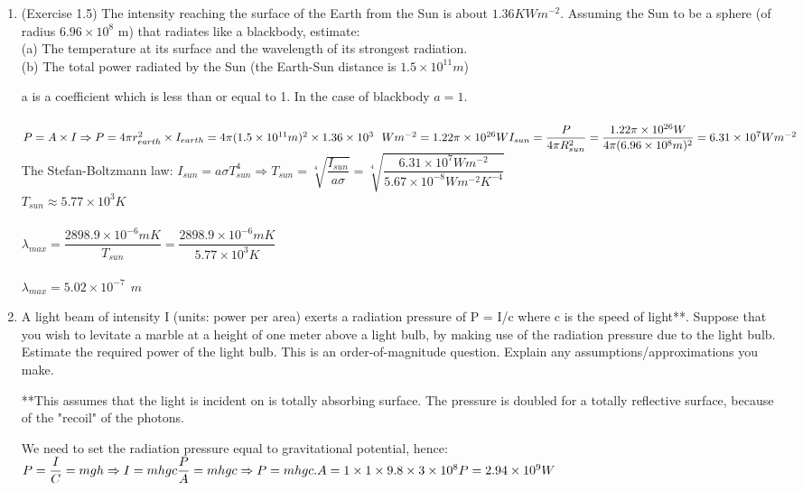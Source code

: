 \documentclass[fleqn]{article}
\begin{document}
\begin{enumerate}
    \item (Exercise 1.5) The intensity reaching the surface of the Earth from the Sun is about $1.36 K Wm^{-2}$. Assuming the Sun to be a sphere (of radius $6.96 \times 10^8$ m) that radiates like a blackbody, estimate: \\
    (a) The temperature at its surface and the wavelength of its strongest radiation. \\
    (b) The total power radiated by the Sun (the Earth-Sun distance is $1.5 \times 10^{11} m$)

      \textcolor{hwColor}{
        a is a coefficient which is less than or equal to 1. In the case of 
        blackbody $a=1$. \\
        \\
        $
          P=A \times I \Rightarrow P=4\pi r_{earth}^2 \times I_{earth}=4\pi(1.5 \times 10^{11} m)^2 \times 1.36 \times 10^3 ~~ Wm^{-2}=1.22 \pi \times 10^{26} W \\
          \\
          I_{sun}=\dfrac{P}{4 \pi R_{sun}^2}=\dfrac{1.22 \pi \times 10^{26} W}{4\pi (6.96 \times 10^8 m)^2}=6.31 \times 10^7 Wm^{-2} \\
        $
        The Stefan-Boltzmann law: $I_{sun}=a \sigma T_{sun}^4 \Longrightarrow T_{sun}=\sqrt[4]{\dfrac{I_{sun}}{a\sigma}}=\sqrt[4]{\dfrac{6.31 \times 10^7 Wm^{-2}}{5.67 \times 10^{-8} W m^{-2} K^{-4}}}$ \\
        $T_{sun} \approx 5.77 \times 10^3 K$ \\
        \\
        $\lambda_{max}=\dfrac{2898.9 \times 10^{-6} mK}{T_{sun}}=\dfrac{2898.9 \times 10^{-6} mK}{5.77 \times 10^3 K}$ \\
        \\
        $\lambda_{max}=5.02 \times 10^{-7} ~~ m$
      }

      \bigbreak

    \item A light beam of intensity I (units: power per area) exerts a radiation pressure of P = I/c where c is the speed of light**.  Suppose that you wish to levitate a marble at a height of one meter above a light bulb, by making use of the radiation pressure due to the light bulb.  Estimate the required power of the light bulb.  This is an order-of-magnitude question.  Explain any assumptions/approximations you make. 
    
    **This assumes that the light is incident on is totally absorbing surface.  The pressure is doubled for a totally reflective surface, because of the "recoil" of the photons.
    
      \textcolor{hwColor}{
        We need to set the radiation pressure equal to gravitational potential, hence: \\
        $
          P=\dfrac{I}{C}=mgh \Rightarrow I=mhgc \\
          \\
          \dfrac{P}{A}=mhgc \Rightarrow P=mhgc.A=1 \times 1 \times 9.8 \times 3 \times 10^8 \\
          \\
          P=2.94 \times 10^9 W
        $
      }

  \end{enumerate}
\end{document}
